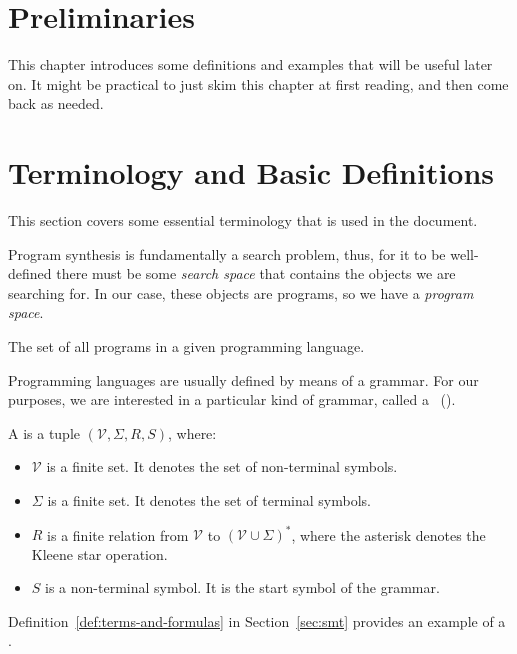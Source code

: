 \section{Preliminaries}
\label{sec:preliminaries}

This chapter introduces some definitions and examples that will be useful later
on. It might be practical to just skim this chapter at first reading, and then
come back as needed.

\section{Terminology and Basic Definitions}
\label{sec:terminology}

This section covers some essential terminology that is used in the document.

Program synthesis is fundamentally a search problem, thus, for it to be
well-defined there must be some \textit{search space} that contains the objects
we are searching for.
In our case, these objects are programs, so we have a \textit{program space}.

\begin{definition}
  The set of all programs in a given programming language.
\end{definition}

Programming languages are usually defined by means of a grammar.
For our purposes, we are interested in a particular kind of grammar, called a
~().

\begin{definition}
  A  is a tuple $(\mathcal{V}, \Sigma{}, R, S)$, where:
  \begin{itemize}
  \item $\mathcal{V}$ is a finite set. It denotes the set of non-terminal symbols.
  \item $\Sigma{}$ is a finite set. It denotes the set of terminal symbols.
  \item $R$ is a finite relation from $\mathcal{V}$ to $(\mathcal{V} \cup
    \Sigma{})^*$, where the asterisk denotes the Kleene star operation.
  \item $S$ is a non-terminal symbol. It is the start symbol of the grammar.
  \end{itemize}
\end{definition}

Definition~\ref{def:terms-and-formulas} in Section~\ref{sec:smt} provides an
example of a .


